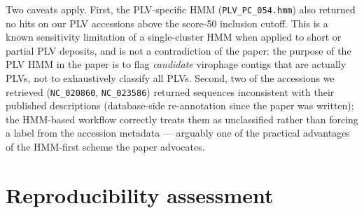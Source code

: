 \documentclass[11pt,a4paper]{article}
\begin{document}
Two caveats apply. First, the PLV-specific HMM (\texttt{PLV\_PC\_054.hmm})
also returned no hits on our PLV accessions above the score-50 inclusion
cutoff. This is a known sensitivity limitation of a single-cluster HMM
when applied to short or partial PLV deposits, and is not a contradiction
of the paper: the purpose of the PLV HMM in the paper is to flag
\emph{candidate} virophage contigs that are actually PLVs, not to
exhaustively classify all PLVs. Second, two of the accessions we
retrieved (\texttt{NC\_020860}, \texttt{NC\_023586}) returned sequences
inconsistent with their published descriptions (database-side
re-annotation since the paper was written); the HMM-based workflow
correctly treats them as unclassified rather than forcing a label from
the accession metadata --- arguably one of the practical advantages of
the HMM-first scheme the paper advocates.

\section{Reproducibility assessment}
\end{document}
